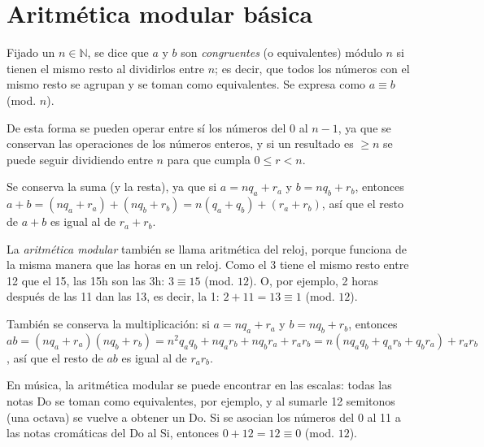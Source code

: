 	\section{Aritmética modular básica}
		Fijado un $n\in\mathbb{N}$, se dice que $a$ y $b$ son \textit{congruentes} (o equivalentes) módulo $n$ si tienen el mismo resto al dividirlos entre $n$; es decir, que todos los números con el mismo resto se agrupan y se toman como equivalentes. Se expresa como $a\equiv b$ (mod. $n$).
	
		De esta forma se pueden operar entre sí los números del 0 al $n-1$, ya que se conservan las operaciones de los números enteros, y si un resultado es $\geq n$ se puede seguir dividiendo entre $n$ para que cumpla $0\leq r<n$.
		
		Se conserva la suma (y la resta), ya que si $a=nq_a+r_a$ y $b=nq_b+r_b$, entonces $a+b=(nq_a+r_a)+(nq_b+r_b)=n(q_a+q_b)+(r_a+r_b)$, así que el resto de $a+b$ es igual al de $r_a+r_b$.
		
		La \textit{aritmética modular} también se llama aritmética del reloj, porque funciona de la misma manera que las horas en un reloj. Como el 3 tiene el mismo resto entre 12 que el 15, las 15h son las 3h: $3\equiv15$ (mod. $12$). O, por ejemplo, 2 horas después de las 11 dan las 13, es decir, la 1: $2+11=13\equiv1$ (mod. $12$). 
		
		También se conserva la multiplicación: si $a=nq_a+r_a$ y $b=nq_b+r_b$, entonces $ab=(nq_a+r_a)(nq_b+r_b)=n^2q_aq_b+nq_ar_b+nq_br_a+r_ar_b=n(nq_aq_b+q_ar_b+q_br_a)+r_ar_b$, así que el resto de $ab$ es igual al de $r_ar_b$.
		
		En música, la aritmética modular se puede encontrar en las escalas: todas las notas Do se toman como equivalentes, por ejemplo, y al sumarle 12 semitonos (una octava) se vuelve a obtener un Do. Si se asocian los números del 0 al 11 a las notas cromáticas del Do al Si, entonces $0+12=12\equiv0$ (mod. $12$).